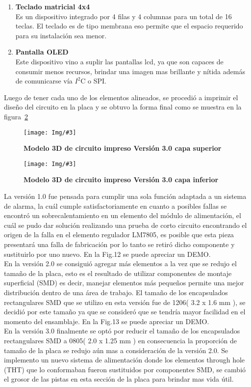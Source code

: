 \documentclass[times, 10pt,twocolumn]{article}
\newcommand{\Img}[5]{
   \begin{figure}[H]
   	   \centering
       \texttt{[image: Img/\#3]}
       \caption{ \centering \textbf{\small #4}}
       \label{#5}
       \end{figure}
   }
\begin{document}
\begin{enumerate}[label=\emph{\Alph*.}]
  \item \textbf{Teclado matricial 4x4}\\ Es un dispositivo integrado por 4 filas y 4 columnas para un total de 16 teclas. El teclado es de tipo membrana eso permite que el espacio requerido para su instalación sea menor.
  \item \textbf{Pantalla OLED}\\ Este dispositivo vino a suplir las pantallas lcd, ya que son capaces de consumir menos recursos, brindar una imagen mas brillante y nítida además 
    de comunicarse vía $I^{2}$C o SPI.
\end{enumerate}


Luego de tener cada uno de los elementos alineados, se procedió a imprimir el diseño del circuito en la placa y se obtuvo la forma final como se muestra en la figura~\ref{fig:11}
\Img{7.9cm}{7.0cm}{tercera_version_3d}{Modelo 3D de circuito impreso Versión 3.0 capa superior}{fig:11}
\Img{6.9cm}{6.0cm}{tercera_version_pcb_b}{Modelo 3D de circuito impreso Versión 3.0 capa inferior}{fig:11}

La versión 1.0 fue pensada para cumplir una sola función adaptada a un sistema  de alarma, la cuál cumple satisfactoriamente en cuanto a posibles fallas se encontró un sobrecalentamiento en un elemento del módulo de alimentación, el cuál se pudo dar solución realizando una prueba de corto circuito encontrando el origen de la falla en el elemento regulador LM7805, es posible que esta pieza presentará una falla de fabricación por lo tanto se retiró dicho componente y sustituirlo por uno nuevo. En la Fig.12 se puede apreciar un DEMO.\\

En la versión 2.0 se consiguió agregar más elementos a la vez que se redujo el tamaño
de la placa, esto es el resultado de utilizar componentes de montaje superficial (SMD) es decir, manejar elementos más pequeños permite una mejor distribución dentro de una área de trabajo. El tamaño de los encapsulados rectangulares SMD que se utilizo en esta versión fue de 1206( 3.2 x 1.6 mm ), se decidió por este tamaño ya que se consideró que se tendría mayor facilidad en el momento del ensamblaje. En la Fig.13 se puede apreciar un DEMO.\\

En la versión 3.0 finalmente se optó por reducir el tamaño de los encapsulados rectangulares SMD a 0805( 2.0 x 1.25 mm ) en consecuencia la proporción de tamaño de la placa se redujo aún mas a consideración de la versión 2.0. Se implemento un nuevo sistema de alimentación donde los elementos through hole (THT) que lo conformaban fueron sustituidos por componentes SMD, se cambió el grosor de las pistas en esta sección de la placa para brindar mas vida útil.\\
\end{document}
